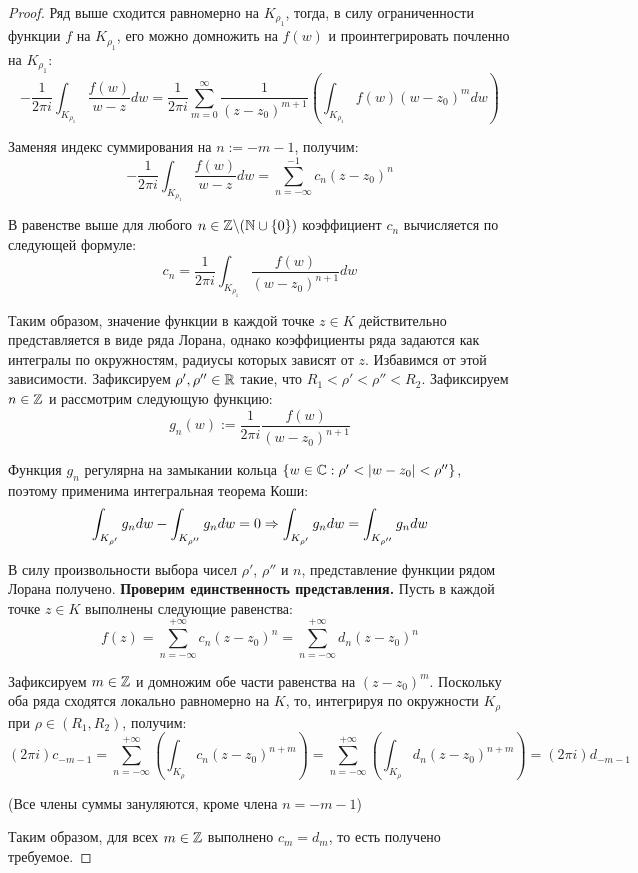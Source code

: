 \begin{proof}
	Ряд выше сходится равномерно на $K_{\rho_1}$, тогда, в силу ограниченности функции $f$ на $K_{\rho_1}$, его можно домножить на $f(w)$ и проинтегрировать почленно на $K_{\rho_1}$:
	\[- \frac1{2\pi i} \int_{K_{\rho_1}}\frac{f(w)}{w - z}dw = \frac1{2\pi i}\sum_{m=0}^\infty\frac1{(z-z_0)^{m + 1}}\left(\int_{K_{\rho_1}}f(w)(w-z_0)^mdw\right)\]
	
	Заменяя индекс суммирования на $n := -m - 1$, получим:
	\[-\frac1{2\pi i} \int_{K_{\rho_1}}\frac{f(w)}{w - z}dw = \sum_{n = -\infty}^{-1}c_n(z - z_0)^n\]
	
	В равенстве выше для любого $n \in \mathbb{Z} \backslash (\mathbb{N} \cup \{0\})$ коэффициент $c_n$ вычисляется по следующей формуле:
	\[c_n = \frac1{2 \pi i}\int_{K_{\rho_1}}\frac{f(w)}{(w - z_0)^{n+1}}dw\]
	
	Таким образом, значение функции в каждой точке $z \in K$ действительно представляется в виде ряда Лорана, однако коэффициенты ряда задаются как интегралы по окружностям, радиусы которых зависят от $z$. Избавимся от этой зависимости. Зафиксируем $\rho', \rho'' \in \mathbb{R}$ такие, что $R_1 < \rho' < \rho'' < R_2$. Зафиксируем $n \in \mathbb{Z}$ и рассмотрим следующую функцию:
	\[g_n(w) := \frac1{2\pi i} \frac{f(w)}{(w - z_0)^{n+1}}\]
	
	Функция $g_n$ регулярна на замыкании кольца $\{w \in \mathbb{C}: \rho' < |w - z_0| < \rho''\}$, поэтому применима интегральная теорема Коши:
	\[\int_{K_{\rho'}}g_ndw - \int_{K_{\rho''}}g_ndw = 0 \Rightarrow \int_{K_{\rho'}}g_ndw = \int_{K_{\rho''}}g_ndw\]
	
	В силу произвольности выбора чисел $\rho'$, $\rho''$ и $n$, представление функции рядом Лорана получено. \textbf{Проверим единственность представления.} Пусть в каждой точке $z \in K$ выполнены следующие равенства:
	\[f(z) = \sum_{n = -\infty}^{+\infty}c_n(z - z_0)^n = \sum_{n = -\infty}^{+\infty}d_n(z - z_0)^n\]
	
	Зафиксируем $m \in \mathbb{Z}$ и домножим обе части равенства на $(z - z_0)^m$. Поскольку оба ряда сходятся локально равномерно на $K$, то, интегрируя по окружности $K_{\rho}$ при $\rho \in (R_1, R_2)$, получим:
	\[{(2\pi i)}{c_{-m - 1}} = \sum_{n = -\infty}^{+\infty}\left(\int_{K_{\rho}}c_{n}(z - z_0)^{n+m}\right) = \sum_{n = -\infty}^{+\infty}\left(\int_{K_{\rho}}d_{n}(z - z_0)^{n+m}\right) = {(2\pi i)}{d_{-m - 1}}\]
 
        (Все члены суммы зануляются, кроме члена $n = -m-1$)
        
	Таким образом, для всех $m \in \mathbb{Z}$ выполнено $c_m = d_m$, то есть получено требуемое.
\end{proof}

